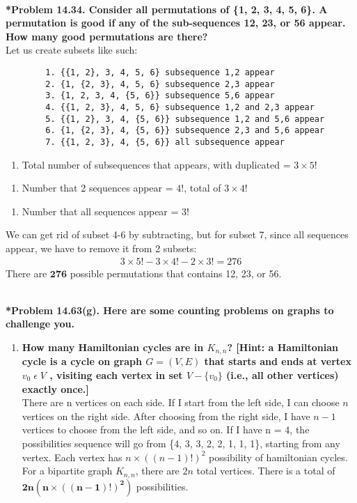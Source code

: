 \documentclass{article}
\begin{document}
    \noindent\\[0.25in]
    \noindent \textbf{*Problem 14.34. Consider all permutations of \{1, 2, 3, 4, 5, 6\}. A permutation is good if any of the sub-sequences 12, 23, or 56 appear. How many good permutations are there?}
    \\ Let us create subsets like such:
    \begin{verbatim}
        1. {{1, 2}, 3, 4, 5, 6} subsequence 1,2 appear
        2. {1, {2, 3}, 4, 5, 6} subsequence 2,3 appear
        3. {1, 2, 3, 4, {5, 6}} subsequence 5,6 appear
        4. {{1, 2, 3}, 4, 5, 6} subsequence 1,2 and 2,3 appear
        5. {{1, 2}, 3, 4, {5, 6}} subsequence 1,2 and 5,6 appear
        6. {1, {2, 3}, 4, {5, 6}} subsequence 2,3 and 5,6 appear
        7. {{1, 2, 3}, 4, {5, 6}} all subsequence appear
    \end{verbatim}
    \begin{enumerate}[label=1-3: ]
        \item Total number of subsequences that appears, with duplicated = $3 \times 5!$
    \end{enumerate}
    \begin{enumerate}[label=4-6: ]
        \item Number that 2 sequences appear = $4!$, total of $3 \times 4!$
    \end{enumerate}
    \begin{enumerate}[label=7: ]
        \item Number that all sequences appear = $3!$
    \end{enumerate}
    We can get rid of subset 4-6 by subtracting, but for subset 7, since all sequences appear, we have to remove it from 2 subsets:
    \begin{align*}
        3 \times 5! - 3 \times 4! - 2 \times 3! = 276
    \end{align*}
    There are {\LARGE $\boxed{\mathbf{276}}$} possible permutations that contains 12, 23, or 56.

    \noindent\\[0.25in]
    \noindent\textbf{*Problem 14.63(g). Here are some counting problems on graphs to challenge you.}
    \begin{enumerate}[label=(g)]
        \item \textbf{How many Hamiltonian cycles are in $K_{n,n}$? [Hint: a Hamiltonian cycle is a cycle on
        graph $G = (V, E)$ that starts and ends at vertex $v_0\;\epsilon\;V$ , visiting each vertex in set
        $V-\{v_0\}$ (i.e., all other vertices) exactly once.]}
        \\ There are n vertices on each side. If I start from the left side, I can choose $n$ vertices on the right side.
        After choosing from the right side, I have $n-1$ vertices to choose from the left side, and so on. If I have n = 4, the
        possibilities sequence will go from \{4, 3, 3, 2, 2, 1, 1, 1\}, starting from any vertex. Each vertex has $n \times ((n-1)!)^2$
        possibility of hamiltonian cycles. For a bipartite graph $K_{n,n}$, there are $2n$ total vertices. There is a total of {\LARGE $\boxed{\mathbf{2n(n\times((n-1)!)^2)}}$} possibilities.
    \end{enumerate}
\end{document}
